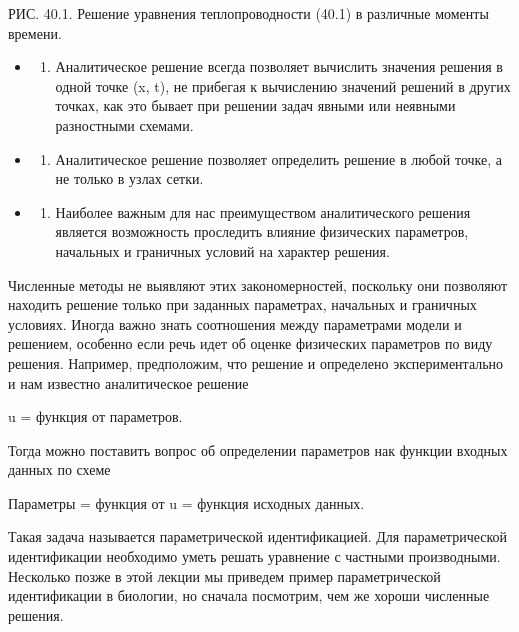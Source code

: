 \documentclass[
]{article}
\providecommand{\tightlist}{%
  \setlength{\itemsep}{0pt}\setlength{\parskip}{0pt}}
\begin{document}
РИС. 40.1. Решение уравнения теплопроводности (40.1) в различные моменты
времени.

\begin{itemize}
\tightlist
\item
  \begin{enumerate}
  \def\labelenumi{\arabic{enumi}.}
  \setcounter{enumi}{1}
  \tightlist
  \item
    Аналитическое решение всегда позволяет вычислить значения решения в
    одной точке (x, t), не прибегая к вычислению значений решений в
    других точках, как это бывает при решении задач явными или неявными
    разностными схемами.
  \end{enumerate}
\item
  \begin{enumerate}
  \def\labelenumi{\arabic{enumi}.}
  \setcounter{enumi}{2}
  \tightlist
  \item
    Аналитическое решение позволяет определить решение в любой точке, а
    не только в узлах сетки.
  \end{enumerate}
\item
  \begin{enumerate}
  \def\labelenumi{\arabic{enumi}.}
  \setcounter{enumi}{3}
  \tightlist
  \item
    Наиболее важным для нас преимуществом аналитического решения
    является возможность проследить влияние физических параметров,
    начальных и граничных условий на характер решения.
  \end{enumerate}
\end{itemize}

Численные методы не выявляют этих закономерностей, поскольку они
позволяют находить решение только при заданных параметрах, начальных и
граничных условиях. Иногда важно знать соотношения между параметрами
модели и решением, особенно если речь идет об оценке физических
параметров по виду решения. Например, предположим, что решение и
определено экспериментально и нам известно аналитическое решение

u = функция от параметров.

Тогда можно поставить вопрос об определении параметров нак функции
входных данных по схеме

Параметры = функция от u = функция исходных данных.

Такая задача называется параметрической идентификацией. Для
параметрической идентификации необходимо уметь решать уравнение с
частными производными. Несколько позже в этой лекции мы приведем пример
параметрической идентификации в биологии, но сначала посмотрим, чем же
хороши численные решения.
\end{document}
